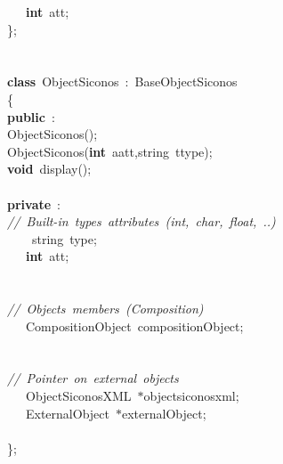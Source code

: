 {\ \ \ \textbf{int}\ att;\\
\};\\
\ \\
\ \\
\textbf{class}\ ObjectSiconos\ :\ BaseObjectSiconos\\
\{\\
\textbf{public}\ :\\
ObjectSiconos();\\
ObjectSiconos(\textbf{int}\ aatt,string\ ttype);\\
\textbf{void}\ display();\\
\ \\
\textbf{private}\ :\\
\textsl{//\ Built-{}in\ types\ attributes\ (int,\ char,\ float,\ ..)}\\
\ \ \ \ string\ type;\ \\
\ \ \ \textbf{int}\ att;\\
\ \\
\ \\
\textsl{//\ Objects\ members\ (Composition)}\\
\ \ \ CompositionObject\ compositionObject;\\
\ \\
\ \\
\textsl{//\ Pointer\ on\ external\ objects}\\
\ \ \ ObjectSiconosXML\ $\ast$objectsiconosxml;\\
\ \ \ ExternalObject\ $\ast$externalObject;\\
\ \\
\};\\
\ \\
\ \\
 }
\normalfont\normalsize

